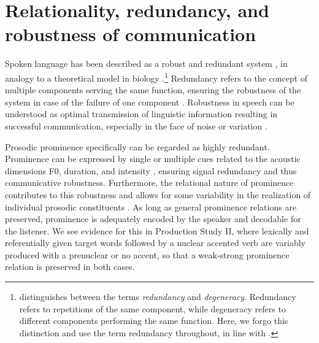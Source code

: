 \section{Relationality, redundancy, and robustness of communication}

Spoken language has been described as a robust and redundant system \citep{winterSpokenLanguageAchieves2014}, in analogy to a theoretical model in biology \citep{kitanoBiologicalRobustness2004}.\footnote{\citet{winterSpokenLanguageAchieves2014} distinguishes between the terms \textit{redundancy} and \textit{degeneracy}. Redundancy refers to repetitions of the same component, while degeneracy refers to different components performing the same function. Here, we forgo this distinction and use the term redundancy throughout, in line with \citet{jasminTailoredPerceptionIndividuals2020}.} Redundancy refers to the concept of multiple components serving the same function, ensuring the robustness of the system in case of the failure of one component \citep{kitanoBiologicalRobustness2004, winterSpokenLanguageAchieves2014}. Robustness in speech can be understood as optimal transmission of linguistic information resulting in successful communication, especially in the face of noise or variation \citep{winterSpokenLanguageAchieves2014}.

Prosodic prominence specifically can be regarded as highly redundant. Prominence can be expressed by single or multiple cues related to the acoustic dimensions F0, duration, and intensity \citep{kochanskiLoudnessPredictsProminence2005, baumannWhatMakesWord2018, roessigTracingPhoneticSpace2022}, ensuring signal redundancy and thus communicative robustness. Furthermore, the relational nature of prominence contributes to this robustness and allows for some variability in the realization of individual prosodic constituents \citep{terkenFundamentalFrequencyPerceived1991, terkenPerceptionProsodicProminence2000, laddIntonationalPhonology2008}. As long as general prominence relations are preserved, prominence is adequately encoded by the speaker and decodable for the listener. We see evidence for this in Production Study II, where lexically and referentially given target words followed by a nuclear accented verb are variably produced with a prenuclear or no accent, so that a weak-strong prominence relation is preserved in both cases.

